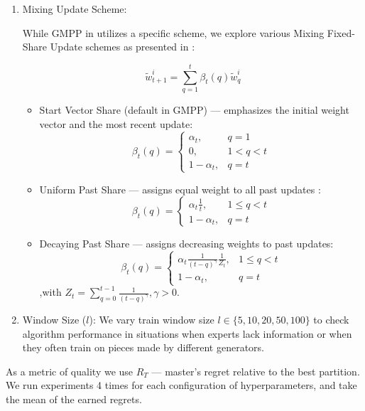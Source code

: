 \documentclass[12pt, twoside]{article}
\begin{document}
\begin{enumerate}
\item Mixing Update Scheme:

While GMPP in \cite{vvbook} utilizes a specific scheme, we explore various Mixing Fixed-Share Update schemes as presented in \cite{article02}:

\[ \widetilde{w}_{t+1}^i = \sum_{q=1}^t\beta_t(q)\widetilde{w}_q^i  \]

\begin{itemize}
\item Start Vector Share (default in GMPP) --- emphasizes the initial weight vector and the most recent update:
    \[\beta_t(q) =
    \begin{cases}
    \alpha_t, & q = 1 \\
    0, & 1 < q < t \\
    1 - \alpha_t, & q = t 
    \end{cases}\]
    
        \item Uniform Past Share ---  assigns equal weight to all past updates : 
            \[\beta_t(q) =
            \begin{cases}
            \alpha_t\frac{1}{t}, & 1 \le q < t \\
            1 - \alpha_t, & q = t 
            \end{cases}\]
            
        \item Decaying Past Share ---  assigns decreasing weights to past updates:
            \[\beta_t(q) =
            \begin{cases}
            \alpha_t\frac{1}{(t-q)^\gamma}\frac{1}{Z_t}, & 1 \le q < t \\
            1 - \alpha_t, & q = t
            \end{cases}\]
            \hfill ,with $Z_t = \sum_{q=0}^{t-1} \frac{1}{(t-q)^\gamma}, \gamma > 0$. 
        
\end{itemize}



\item Window Size ($l$): We vary train window size $l \in \{5, 10, 20, 50, 100\}$ to check algorithm performance in situations when experts lack information or when they often train on pieces made by different generators.

\end{enumerate}

As a metric of quality we use $R_T$ --- master's regret relative to the best partition.
We run experiments 4 times for each configuration of hyperparameters, and take the mean of the earned regrets.
\end{document}
